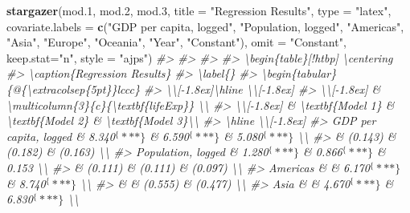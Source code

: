 \documentclass[]{book}
\newenvironment{Shaded}{\begin{snugshade}}{\end{snugshade}}
\newcommand{\CommentTok}[1]{\textcolor[rgb]{0.56,0.35,0.01}{\textit{#1}}}
\newcommand{\DataTypeTok}[1]{\textcolor[rgb]{0.13,0.29,0.53}{#1}}
\newcommand{\FloatTok}[1]{\textcolor[rgb]{0.00,0.00,0.81}{#1}}
\newcommand{\KeywordTok}[1]{\textcolor[rgb]{0.13,0.29,0.53}{\textbf{#1}}}
\newcommand{\NormalTok}[1]{#1}
\newcommand{\StringTok}[1]{\textcolor[rgb]{0.31,0.60,0.02}{#1}}
\begin{document}
\begin{Shaded}
\begin{Highlighting}[]
\KeywordTok{stargazer}\NormalTok{(mod}\FloatTok{.1}\NormalTok{, mod}\FloatTok{.2}\NormalTok{, mod}\FloatTok{.3}\NormalTok{, }\DataTypeTok{title =} \StringTok{"Regression Results"}\NormalTok{, }\DataTypeTok{type =} \StringTok{"latex"}\NormalTok{, }
          \DataTypeTok{covariate.labels  =} \KeywordTok{c}\NormalTok{(}\StringTok{"GDP per capita, logged"}\NormalTok{, }\StringTok{"Population, logged"}\NormalTok{, }\StringTok{"Americas"}\NormalTok{, }\StringTok{"Asia"}\NormalTok{, }\StringTok{"Europe"}\NormalTok{, }\StringTok{"Oceania"}\NormalTok{, }\StringTok{"Year"}\NormalTok{, }\StringTok{"Constant"}\NormalTok{), }
          \DataTypeTok{omit =} \StringTok{"Constant"}\NormalTok{, }
          \DataTypeTok{keep.stat=}\StringTok{"n"}\NormalTok{, }\DataTypeTok{style =} \StringTok{"ajps"}\NormalTok{)}
\CommentTok{#> }
\CommentTok{#> %
\CommentTok{#> %
\CommentTok{#> \textbackslash{}begin\{table\}[!htbp] \textbackslash{}centering }
\CommentTok{#>   \textbackslash{}caption\{Regression Results\} }
\CommentTok{#>   \textbackslash{}label\{\} }
\CommentTok{#> \textbackslash{}begin\{tabular\}\{@\{\textbackslash{}extracolsep\{5pt\}\}lccc\} }
\CommentTok{#> \textbackslash{}\textbackslash{}[-1.8ex]\textbackslash{}hline \textbackslash{}\textbackslash{}[-1.8ex] }
\CommentTok{#> \textbackslash{}\textbackslash{}[-1.8ex] & \textbackslash{}multicolumn\{3\}\{c\}\{\textbackslash{}textbf\{lifeExp\}\} \textbackslash{}\textbackslash{} }
\CommentTok{#> \textbackslash{}\textbackslash{}[-1.8ex] & \textbackslash{}textbf\{Model 1\} & \textbackslash{}textbf\{Model 2\} & \textbackslash{}textbf\{Model 3\}\textbackslash{}\textbackslash{} }
\CommentTok{#> \textbackslash{}hline \textbackslash{}\textbackslash{}[-1.8ex] }
\CommentTok{#>  GDP per capita, logged & 8.340$^\{***\}$ & 6.590$^\{***\}$ & 5.080$^\{***\}$ \textbackslash{}\textbackslash{} }
\CommentTok{#>   & (0.143) & (0.182) & (0.163) \textbackslash{}\textbackslash{} }
\CommentTok{#>   Population, logged & 1.280$^\{***\}$ & 0.866$^\{***\}$ & 0.153 \textbackslash{}\textbackslash{} }
\CommentTok{#>   & (0.111) & (0.111) & (0.097) \textbackslash{}\textbackslash{} }
\CommentTok{#>   Americas &  & 6.170$^\{***\}$ & 8.740$^\{***\}$ \textbackslash{}\textbackslash{} }
\CommentTok{#>   &  & (0.555) & (0.477) \textbackslash{}\textbackslash{} }
\CommentTok{#>   Asia &  & 4.670$^\{***\}$ & 6.830$^\{***\}$ \textbackslash{}\textbackslash{} }
}}
\end{Highlighting}
\end{Shaded}
\end{document}

